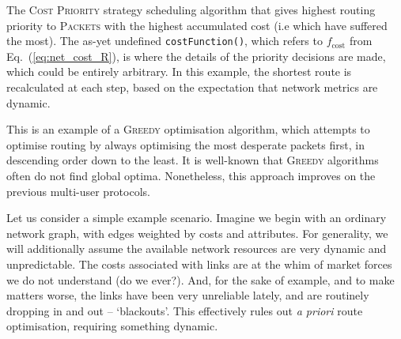 \documentclass[aps, rmp, twocolumn, amsmath, amssymb, nofootinbib, superscriptaddress, longbibliography, floatfix, table-of-contents, eqsecnum]{revtex4-1}
\begin{document}
\begin{table}[!htb]
\caption{The \textsc{Cost Priority} strategy scheduling algorithm that gives highest routing priority to \textsc{Packets} with the highest accumulated cost (i.e which have suffered the most). The as-yet undefined \texttt{costFunction()}, which refers to $f_\text{cost}$ from Eq.~(\ref{eq:net_cost_R}), is where the details of the priority decisions are made, which could be entirely arbitrary. In this example, the shortest route is recalculated at each step, based on the expectation that network metrics are dynamic.} \label{alg:cost_prior_alg}
\end{table}

This is an example of a \textsc{Greedy} optimisation algorithm, which attempts to optimise routing by always optimising the most desperate packets first, in descending order down to the least. It is well-known that \textsc{Greedy} algorithms often do not find global optima. Nonetheless, this approach improves on the previous multi-user protocols.

Let us consider a simple example scenario. Imagine we begin with an ordinary network graph, with edges weighted by costs and attributes. For generality, we will additionally assume the available network resources are very dynamic and unpredictable. The costs associated with links are at the whim of market forces we do not understand (do we ever?). And, for the sake of example, and to make matters worse, the links have been very unreliable lately, and are routinely dropping in and out -- `blackouts'. This effectively rules out \textit{a priori} route optimisation, requiring something dynamic.
\end{document}

